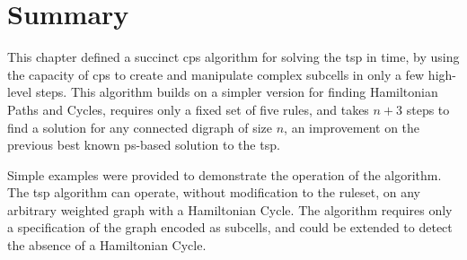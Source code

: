\section{\label{sec:tsp:conc}Summary}
This chapter defined a succinct \gls{cps} algorithm for solving the \gls{tsp} in  time, by using the capacity of \gls{cps} to create and manipulate complex subcells in only a few high-level steps.  This algorithm builds on a simpler version for finding Hamiltonian Paths and Cycles, requires only a fixed set of five rules, and takes \(n + 3\) steps to find a solution for any connected digraph of size \(n\), an improvement on the previous best known \gls{ps}-based solution to the \gls{tsp}.

Simple examples were provided to demonstrate the operation of the algorithm.  The \gls{tsp} algorithm can operate, without modification to the \gls{ruleset}, on any arbitrary weighted graph with a Hamiltonian Cycle.   The algorithm requires only a specification of the graph encoded as subcells, and could be extended to detect the absence of a Hamiltonian Cycle.